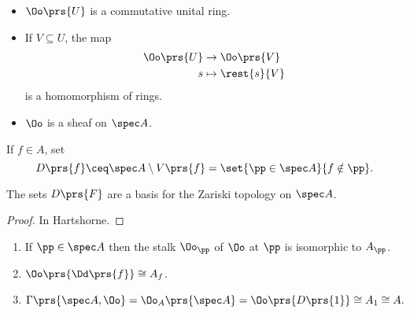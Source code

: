 \documentclass[10pt,a4paper,twoside,openany,hidelinks]{book}
\begin{document}
\begin{proposition}
\begin{itemize}
\item $\Oo\prs{U}$ is a commutative unital ring.
\item If $V \subseteq U$, the map
\begin{align*}
\Oo\prs{U} &\to \Oo\prs{V} \\
s &\mapsto \rest{s}{V}
\end{align*}
is a homomorphism of rings.
\item $\Oo$ is a sheaf on $\spec A$.
\end{itemize}
\end{proposition}

\begin{definition}
If $f \in A$, set \[D\prs{f} \ceq \spec A \setminus V\prs{f} = \set{\pp \in \spec A}{f \notin \pp} \text{.}\]
\end{definition}

\begin{lemma}
The sets $D\prs{F}$ are a basis for the Zariski topology on $\spec A$.
\end{lemma}

\begin{proof}
In Hartshorne.
\end{proof}

\begin{proposition}
\begin{enumerate}
\item If $\pp \in \spec A$ then the stalk $\Oo_\pp$ of $\Oo$ at $\pp$ is isomorphic to $A_\pp$.
\item $\Oo\prs{\Dd\prs{f}} \cong A_f$.
\item
\[\Gamma\prs{\spec A, \Oo} = \Oo_A\prs{\spec A} = \Oo\prs{D\prs{1}} \cong A_1 \cong A \text{.}\]
\end{enumerate}
\end{proposition}

\backmatter
\end{document}
